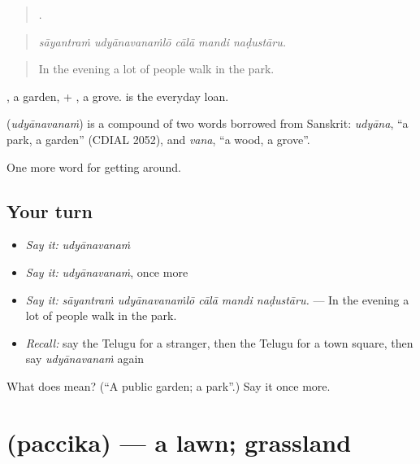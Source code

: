 \begin{quote}
    .
\end{quote}

\begin{quote}
\emph{sāyantraṁ udyānavanaṁlō cālā mandi naḍustāru.}
\end{quote}

\begin{quote}
In the evening a lot of people walk in the park.
\end{quote}

, a garden, + , a grove.  is the everyday loan.

\begin{cousinweb}
\textbf{} (\emph{udyānavanaṁ}) is a compound of two words borrowed from Sanskrit: \emph{udyāna}, \textquotedblleft{}a park, a garden\textquotedblright{} (CDIAL 2052), and \emph{vana}, \textquotedblleft{}a wood, a grove\textquotedblright{}.
\end{cousinweb}

\begin{grammarlens}[title={What you've built}]
One more word for getting around.
\end{grammarlens}

\subsection*{Your turn}
\begin{itemize}
\raggedright
  \item \emph{Say it:} \emph{udyānavanaṁ}
  \item \emph{Say it:} \emph{udyānavanaṁ}, once more
  \item \emph{Say it:} \emph{sāyantraṁ udyānavanaṁlō cālā mandi naḍustāru.} — In the evening a lot of people walk in the park.
  \item \emph{Recall:} say the Telugu for a stranger, then the Telugu for a town square, then say \emph{udyānavanaṁ} again
\end{itemize}

\begin{tcolorbox}[breakable,colback=teal!4,colframe=teal!35!black,title={Before you move on}]
What does  mean? (\textquotedblleft{}A public garden; a park\textquotedblright{}.) Say it once more.
\end{tcolorbox}
\section[\texorpdfstring{\te{పచ్చిక} (paccika)}{పచ్చిక (paccika)}]{ (paccika) — a lawn; grassland}

